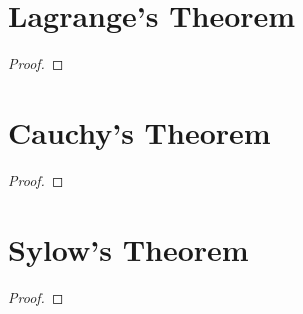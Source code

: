     \section{Lagrange's Theorem}
        \begin{theorem}
        \end{theorem}
        \begin{proof}
        \end{proof}
    \section{Cauchy's Theorem}
        \begin{theorem}
        \end{theorem}
        \begin{proof}
        \end{proof}
    \section{Sylow's Theorem}
        \begin{theorem}
        \end{theorem}
        \begin{proof}
        \end{proof}

